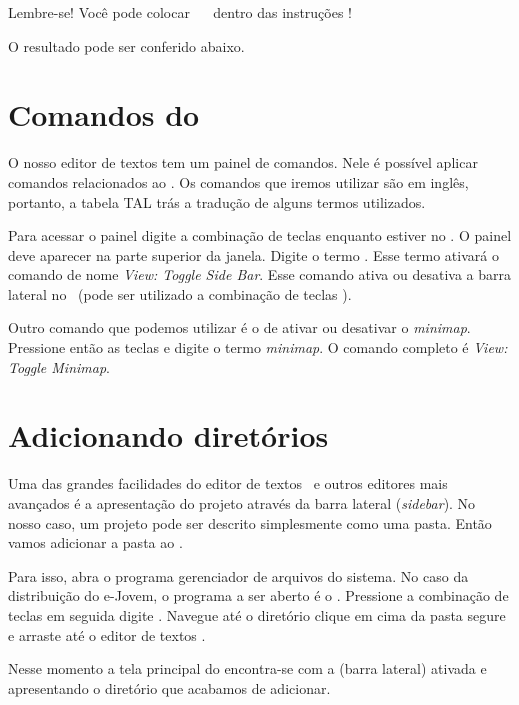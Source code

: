 

Lembre-se! Você pode colocar \tags~ \html~dentro das instruções \php!

O resultado pode ser conferido abaixo.


\section{Comandos do \sublime}
\label{comandos-do-sublime}

O nosso editor de textos tem um painel de comandos. Nele é possível aplicar comandos
relacionados ao \sublime. Os comandos que iremos utilizar são em inglês, portanto,
a tabela TAL trás a tradução de alguns termos utilizados.

Para acessar o painel digite a combinação de teclas \ctrlshiftp enquanto estiver
no \sublime. O painel deve aparecer na parte superior da janela. Digite o termo
\sidebar. Esse termo ativará o comando de nome \textit{View: Toggle Side Bar}.
Esse comando ativa ou desativa a barra lateral no \sublime~(pode ser utilizado
a combinação de teclas \sublimesidebar). 

Outro comando que podemos utilizar é o de ativar ou desativar o \textit{minimap}. 
Pressione então as teclas \ctrlshiftp e digite o termo \textit{minimap}. 
O comando completo é \textit{View: Toggle Minimap}.

\section{Adicionando diretórios}
\label{adicionando-diretorios}

Uma das grandes facilidades do editor de textos \sublime~e outros editores mais
avançados é a apresentação do projeto através da barra lateral (\textit{sidebar}).
No nosso caso, um projeto pode ser descrito simplesmente como uma pasta. Então
vamos adicionar a pasta  ao \sublime. 

Para isso, abra o programa gerenciador de arquivos do sistema. No caso da 
distribuição do e-Jovem, o programa a ser aberto é o \thunar. Pressione a 
combinação de teclas \altfdois em seguida digite \thunar. Navegue até o 
diretório  clique em cima da pasta  
segure e arraste até o editor de textos \sublime.

Nesse momento a tela principal do \sublime encontra-se com a \sideb (barra lateral)
ativada e apresentando o diretório que acabamos de adicionar.

